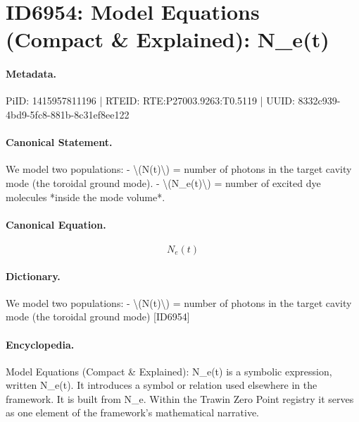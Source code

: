 \section*{ID6954: Model Equations (Compact \& Explained): N\_e(t)}
\paragraph{Metadata.}
PiID: 1415957811196 | RTEID: RTE:P27003.9263:T0.5119 | UUID: 8332c939-4bd9-5fc8-881b-8c31ef8ee122

\paragraph{Canonical Statement.}
We model two populations: - \textbackslash{}(N(t)\textbackslash{}) = number of photons in the target cavity mode (the toroidal ground mode). - \textbackslash{}(N\_e(t)\textbackslash{}) = number of excited dye molecules *inside the mode volume*.

\paragraph{Canonical Equation.}
\[
N_e(t)
\]

\paragraph{Dictionary.}
We model two populations: - \textbackslash{}(N(t)\textbackslash{}) = number of photons in the target cavity mode (the toroidal ground mode) [ID6954]

\paragraph{Encyclopedia.}
Model Equations (Compact \& Explained): N\_e(t) is a symbolic expression, written N\_e(t). It introduces a symbol or relation used elsewhere in the framework. It is built from N\_e. Within the Trawin Zero Point registry it serves as one element of the framework's mathematical narrative.
